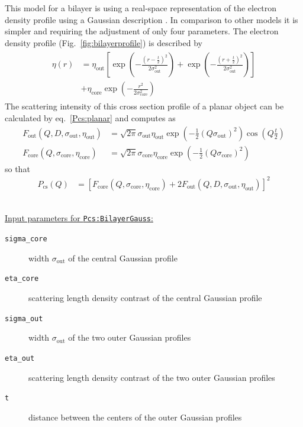 This model for a bilayer is using a real-space representation of the electron density profile
using a Gaussian description \cite{Pabst2000,Pabst2003}. In comparison to other models it
is simpler and requiring the adjustment of only four parameters. The electron density profile
(Fig.\ \ref{fig:bilayerprofile}) is described by
\begin{align}
\begin{split}
\eta(r) &=  \eta_\textrm{out} \left[ \exp\left(-\frac{\left(r-\frac{t}{2}\right)^2}{2\sigma_\textrm{out}^2}\right) +
   \exp\left(-\frac{\left(r+\frac{t}{2}\right)^2}{2\sigma_\textrm{out}^2}\right) \right] \\
          &+ \eta_\textrm{core} \exp\left(-\frac{r^2}{2\sigma_\textrm{core}^2}\right)
          \label{eq:BiLayerGaussianProfile}
\end{split}
\end{align}
The scattering intensity of this cross section profile of a planar object can be calculated by eq.\ \ref{Pcs:planar}
and computes as
\begin{align}
   F_\text{out}\left(Q,D,\sigma_\textrm{out},\eta_\textrm{out}\right)  &= \sqrt{2\pi}\sigma_\textrm{out}  \eta_\textrm{out}  \exp\left(-\frac{1}{2}\left(Q\sigma_\textrm{out} \right)^2\right) \cos\left(Q\frac{t}{2}\right) \\
   F_\text{core}\left(Q,\sigma_\textrm{core},\eta_\textrm{core}\right) &= \sqrt{2\pi}\sigma_\textrm{core} \eta_\textrm{core} \exp\left(-\frac{1}{2}\left(Q\sigma_\textrm{core}\right)^2\right)
\end{align}
so that
\begin{align}
  P_\text{cs}\left(Q\right)   &=\left[F_\text{core}\left(Q,\sigma_\textrm{core}, \eta_\textrm{core}\right)
                                   +2 F_\text{out} \left(Q,D,\sigma_\textrm{out},\eta_\textrm{out} \right)\right]^2
  \label{eq:PcsBilayer}
\end{align}

\vspace{5mm}

\hspace{1pt}\\
\underline{Input parameters for \texttt{Pcs:BilayerGauss}:}
\begin{description}
    \item[\texttt{sigma\_core}] width $\sigma_\mathrm{out}$ of the central Gaussian profile
    \item[\texttt{eta\_core}] scattering length density contrast of the central Gaussian profile
    \item[\texttt{sigma\_out}] width $\sigma_\mathrm{out}$ of the two outer Gaussian profiles
    \item[\texttt{eta\_out}] scattering length density contrast of the two outer Gaussian profiles
    \item[\texttt{t}] distance between the centers of the outer Gaussian profiles
\end{description}

